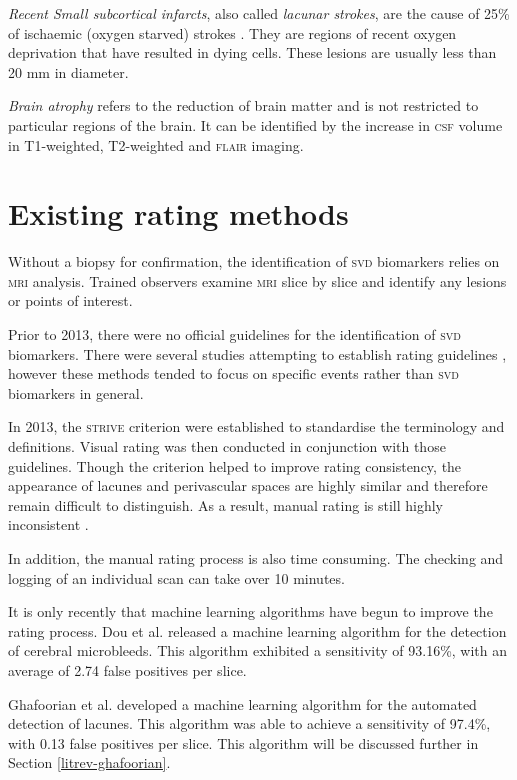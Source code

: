 \textit{Recent Small subcortical infarcts}, also called \textit{lacunar strokes}, are the cause of 25\% of ischaemic (oxygen starved) strokes \cite{WardlawJ.M.2013Nsfr}. They are regions of recent oxygen deprivation that have resulted in dying cells. These lesions are usually less than 20 mm in diameter. 

\textit{Brain atrophy} refers to the reduction of brain matter and is not restricted to particular regions of the brain. It can be identified by the increase in \textsc{csf} volume in T1-weighted, T2-weighted and \textsc{flair} imaging.

\section{Existing rating methods}\label{svd-rating}

Without a biopsy for confirmation, the identification of \textsc{svd} biomarkers relies on \textsc{mri} analysis. Trained observers examine \textsc{mri} slice by slice and identify any lesions or points of interest.

Prior to 2013, there were no official guidelines for the identification of \textsc{svd} biomarkers. There were several studies attempting to establish rating guidelines \cite{AdamsH.H.Hieab2013RMfD, PotterGillian2015CPSV}, however these methods tended to focus on specific events rather than \textsc{svd} biomarkers in general.


In 2013, the \textsc{strive} criterion \cite{WardlawJ.M.2013Nsfr} were established to standardise the terminology and definitions. Visual rating was then conducted in conjunction with those guidelines. Though the criterion helped to improve rating consistency, the appearance of lacunes and perivascular spaces are highly similar and therefore remain difficult to distinguish. As a result, manual rating is still highly inconsistent \cite{PotterGillian2015CPSV}. 

In addition, the manual rating process is also time consuming. The checking and logging of an individual scan can take over 10 minutes.

It is only recently that machine learning algorithms have begun to improve the rating process. Dou et al. \cite{DouQ.2016ADoC} released a machine learning algorithm for the detection of cerebral microbleeds. This algorithm exhibited a sensitivity of 93.16\%, with an average of 2.74 false positives per slice. 

Ghafoorian et al. \cite{GhafoorianM.2017Dml3} developed a machine learning algorithm for the automated detection of lacunes. This algorithm was able to achieve a sensitivity of 97.4\%, with 0.13 false positives per slice. This algorithm will be discussed further in Section \ref{litrev-ghafoorian}.


